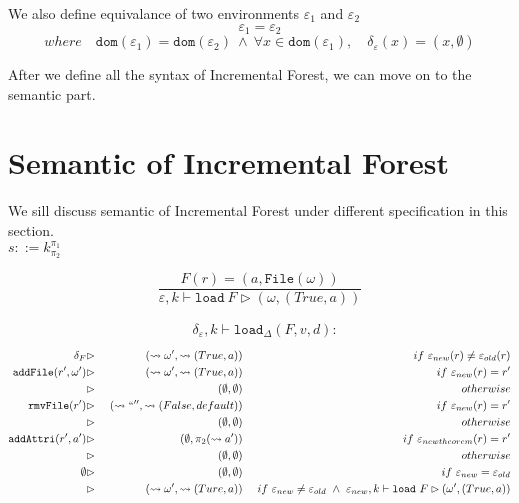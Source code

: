 \documentclass[10pt,twoside,a4paper]{article}
\theoremstyle{theorem}
\theoremstyle{lemma}
\theoremstyle{property}
\theoremstyle{definition}
\theoremstyle{assumption}
\def\snd{\pi_2}
\begin{document}
We also define equivalance of two environments $\varepsilon_1$ and $\varepsilon_2$
\begin{displaymath}
	\varepsilon_1 = \varepsilon_2
\end{displaymath}
\begin{displaymath}
	where \quad \mathtt{dom}(\varepsilon_1) = \mathtt{dom}(\varepsilon_2) ~\wedge~ \forall x \in \mathtt{dom}(\varepsilon_1), \quad \delta_\varepsilon(x) = (x, \emptyset)
\end{displaymath}

After we define all the syntax of Incremental Forest, we can move on to the semantic part.

\section{Semantic of Incremental Forest}

We sill discuss semantic of Incremental Forest under different specification in this section.\\

$\boxed{s ::= k^{\pi_1}_{\pi_2}}$

\begin{displaymath}
	\frac{F(r) = (a, \mathtt{File}(\omega))}
	{\varepsilon, k \vdash \mathtt{load}~F \rhd (\omega, (True, a))}
\end{displaymath}

\begin{align*}
	&\delta_\varepsilon, k \vdash \mathtt{load}_\Delta (F,v,d):
\end{align*}
\begin{align*}
	\delta_F					 &\rhd& ~(\leadsto \omega', \leadsto(True, a))			& &~if ~\varepsilon_{new}(r) \not= \varepsilon_{old}(r) \\
	\mathtt{addFile}(r',\omega') &\rhd& ~(\leadsto \omega', \leadsto(True, a))			& &~if ~\varepsilon_{new}(r) = r' \\
								 &\rhd& ~(\emptyset,\emptyset)								& &~otherwise \\
	\mathtt{rmvFile}(r') 		 &\rhd& ~(\leadsto `` '', \leadsto(False, default))			& &~if ~\varepsilon_{new}(r) = r' \\
								 &\rhd& ~(\emptyset,\emptyset)								& &~otherwise \\
	\mathtt{addAttri}(r', a')	 &\rhd& ~(\emptyset, \snd(\leadsto a'))				& &~if ~\varepsilon_{newtheorem}(r) = r' \\
								 &\rhd& ~(\emptyset,\emptyset)								& &~otherwise	\\
	\emptyset					 &\rhd& ~(\emptyset,\emptyset)								& &~ if ~\varepsilon_{new} = \varepsilon_{old}\\
								 &\rhd& ~(\leadsto \omega', \leadsto (Ture, a))				& &~ if ~\varepsilon_{new} \not= \varepsilon_{old} ~\wedge ~\varepsilon_{new}, k \vdash \mathtt{load}~F \rhd (\omega', (True, a))
\end{align*}
\end{document}
